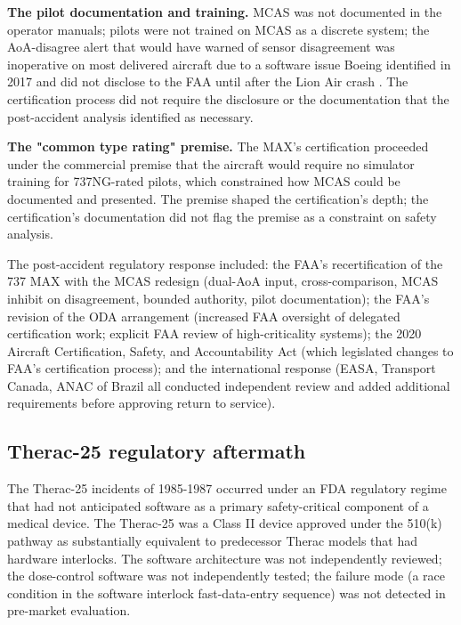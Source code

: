 \textbf{The pilot documentation and training.} MCAS was not documented in the operator manuals; pilots were not trained on MCAS as a discrete system; the AoA-disagree alert that would have warned of sensor disagreement was inoperative on most delivered aircraft due to a software issue Boeing identified in 2017 and did not disclose to the FAA until after the Lion Air crash \cite{acc:house-737max-2020}. The certification process did not require the disclosure or the documentation that the post-accident analysis identified as necessary.

\textbf{The "common type rating" premise.} The MAX's certification proceeded under the commercial premise that the aircraft would require no simulator training for 737NG-rated pilots, which constrained how MCAS could be documented and presented. The premise shaped the certification's depth; the certification's documentation did not flag the premise as a constraint on safety analysis.

The post-accident regulatory response included: the FAA's recertification of the 737 MAX with the MCAS redesign (dual-AoA input, cross-comparison, MCAS inhibit on disagreement, bounded authority, pilot documentation); the FAA's revision of the ODA arrangement (increased FAA oversight of delegated certification work; explicit FAA review of high-criticality systems); the 2020 Aircraft Certification, Safety, and Accountability Act (which legislated changes to FAA's certification process); and the international response (EASA, Transport Canada, ANAC of Brazil all conducted independent review and added additional requirements before approving return to service).

\subsection*{Therac-25 regulatory aftermath}

The Therac-25 incidents of 1985-1987 \cite{paper:leveson-turner1993} occurred under an FDA regulatory regime that had not anticipated software as a primary safety-critical component of a medical device. The Therac-25 was a Class II device approved under the 510(k) pathway as substantially equivalent to predecessor Therac models that had hardware interlocks. The software architecture was not independently reviewed; the dose-control software was not independently tested; the failure mode (a race condition in the software interlock fast-data-entry sequence) was not detected in pre-market evaluation.

